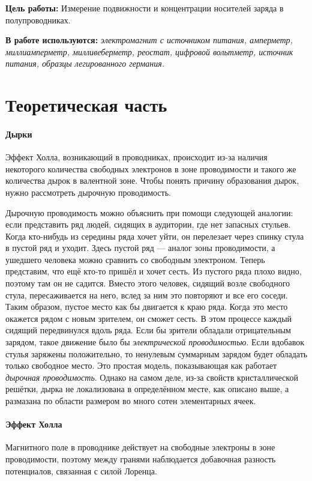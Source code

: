 \documentclass{physlab}
\begin{document}
	

\textbf{Цель работы:} Измерение подвижности и концентрации носителей заряда в полупроводниках.

\textbf{В работе используются:} \textit{электромагнит с источником питания, амперметр, миллиамперметр, милливеберметр, реостат, цифровой вольтметр, источник питания, образцы легированного германия.}


\section{Теоретическая часть}

\paragraph{Дырки}

Эффект Холла, возникающий в проводниках, происходит из-за наличия некоторого количества свободных электронов в зоне проводимости и такого же количества дырок в валентной зоне. Чтобы понять причину образования дырок, нужно рассмотреть дырочную проводимость.


Дырочную проводимость можно объяснить при помощи следующей аналогии: если представить ряд людей, сидящих в аудитории, где нет запасных стульев. Когда кто-нибудь из середины ряда хочет уйти, он      перелезает через спинку стула в пустой ряд и уходит. Здесь пустой ряд — аналог зоны проводимости, а ушедшего человека можно сравнить со свободным электроном.
Теперь представим, что ещё кто-то пришёл и хочет сесть. Из пустого ряда плохо видно, поэтому там он не садится. Вместо этого человек, сидящий возле свободного стула, пересаживается на него, вслед за ним это повторяют и все его соседи. Таким образом, пустое место как бы двигается к краю ряда. Когда это место окажется рядом с новым зрителем, он сможет сесть.
В этом процессе каждый сидящий передвинулся вдоль ряда. Если бы зрители обладали отрицательным зарядом, такое движение было бы  \textit{электрической проводимостью}. Если вдобавок стулья заряжены положительно, то ненулевым суммарным зарядом будет обладать только свободное место. Это простая модель, показывающая как работает \textit{дырочная проводимость}. Однако на самом деле, из-за свойств кристаллической решётки, дырка не локализована в определённом месте, как описано выше, а размазана по области размером во много сотен элементарных ячеек.\\[-10mm]
\paragraph{Эффект Холла} 
Магнитного поле в проводнике действует на свободные электроны в зоне проводимости, поэтому между гранями наблюдается добавочная разность потенциалов, связанная с силой Лоренца. 
\end{document}
